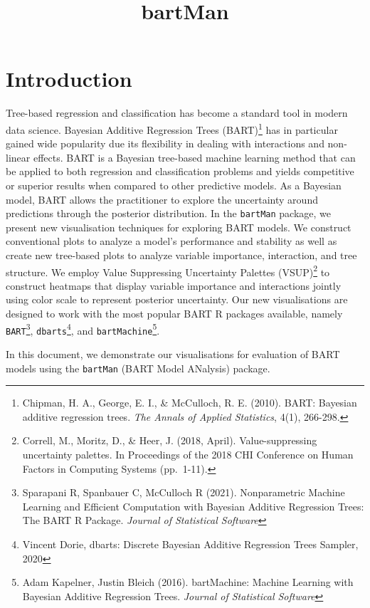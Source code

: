 \documentclass[
]{article}
\title{bartMan}
\author{}
\date{\vspace{-2.5em}}
\begin{document}
\maketitle

\hypertarget{introduction}{%
\section{Introduction}\label{introduction}}

Tree-based regression and classification has become a standard tool in
modern data science. Bayesian Additive Regression Trees
(BART)\footnote{Chipman, H. A., George, E. I., \& McCulloch, R. E.
  (2010). BART: Bayesian additive regression trees. \emph{The Annals of
  Applied Statistics}, 4(1), 266-298.} has in particular gained wide
popularity due its flexibility in dealing with interactions and
non-linear effects. BART is a Bayesian tree-based machine learning
method that can be applied to both regression and classification
problems and yields competitive or superior results when compared to
other predictive models. As a Bayesian model, BART allows the
practitioner to explore the uncertainty around predictions through the
posterior distribution. In the \texttt{bartMan} package, we present new
visualisation techniques for exploring BART models. We construct
conventional plots to analyze a model's performance and stability as
well as create new tree-based plots to analyze variable importance,
interaction, and tree structure. We employ Value Suppressing Uncertainty
Palettes (VSUP)\footnote{Correll, M., Moritz, D., \& Heer, J. (2018,
  April). Value-suppressing uncertainty palettes. In Proceedings of the
  2018 CHI Conference on Human Factors in Computing Systems (pp.~1-11).}
to construct heatmaps that display variable importance and interactions
jointly using color scale to represent posterior uncertainty. Our new
visualisations are designed to work with the most popular BART R
packages available, namely \texttt{BART}\footnote{Sparapani R, Spanbauer
  C, McCulloch R (2021). Nonparametric Machine Learning and Efficient
  Computation with Bayesian Additive Regression Trees: The BART R
  Package. \emph{Journal of Statistical Software}},
\texttt{dbarts}\footnote{Vincent Dorie, dbarts: Discrete Bayesian
  Additive Regression Trees Sampler, 2020}, and
\texttt{bartMachine}\footnote{Adam Kapelner, Justin Bleich (2016).
  bartMachine: Machine Learning with Bayesian Additive Regression Trees.
  \emph{Journal of Statistical Software}}.

In this document, we demonstrate our visualisations for evaluation of
BART models using the \texttt{bartMan} (BART Model ANalysis) package.
\end{document}
